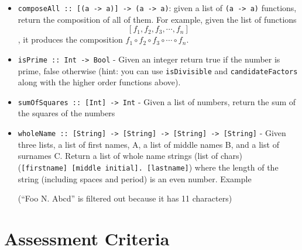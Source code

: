 \begin{itemize}
  \begin{itemize}
  \item
    \texttt{composeAll\ ::\ {[}(a\ -\textgreater{}\ a){]}\ -\textgreater{}\ (a\ -\textgreater{}\ a)}:
    given a list of \texttt{(a\ -\textgreater{}\ a)} functions, return
    the composition of all of them. For example, given the list of
    functions \[[f_1,f_2,f_3,\cdots, f_n]\], it produces the composition
    \(f_1 \circ f_2 \circ f_3 \circ \cdots \circ f_n\).
  \item
    \texttt{isPrime\ ::\ Int\ -\textgreater{}\ Bool} - Given an integer
    return true if the number is prime, false otherwise (hint: you can
    use \texttt{isDivisible} and \texttt{candidateFactors} along with
    the higher order functions above).
  \item
    \texttt{sumOfSquares\ ::\ {[}Int{]}\ -\textgreater{}\ Int} - Given a
    list of numbers, return the sum of the squares of the numbers
  \item
    \texttt{wholeName\ ::\ {[}String{]}\ -\textgreater{}\ {[}String{]}\ -\textgreater{}\ {[}String{]}\ -\textgreater{}\ {[}String{]}}
    - Given three lists, a list of first names, A, a list of middle
    names B, and a list of surnames C. Return a list of whole name
    strings (list of chars)
    (\texttt{{[}firstname{]}\ {[}middle\ initial{]}.\ {[}lastname{]}})
    where the length of the string (including spaces and period) is an
    even number. Example

\begin{Shaded}
\begin{Highlighting}[]
\OperatorTok{\textgreater{}}\NormalTok{ wholeName [}\NormalTok{, }\NormalTok{, }\NormalTok{] [}\NormalTok{, }\NormalTok{, }\NormalTok{] [}\NormalTok{, }\NormalTok{, }\NormalTok{]}
\NormalTok{[}\NormalTok{, }\NormalTok{]}
\end{Highlighting}
\end{Shaded}

    (``Foo N. Abcd'' is filtered out because it has 11 characters)
  \end{itemize}
\end{itemize}

\section{Assessment
Criteria}\label{lab-exercise-3-higher-order-functions.md__assessment-criteria}

